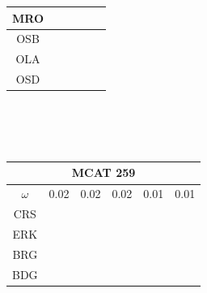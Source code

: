 \documentclass[12pt]{article}
\begin{document}
\begin{landscape}
\begin{figure}
{\begin{minipage}[c]{0.3\textwidth}
\begin{tabular}{|c|c|c|c|c|c|}
        MRO&\cellcolor[HTML]{4DAF4A}&\cellcolor[HTML]{4DAF4A}&\cellcolor[HTML]{4DAF4A}&\cellcolor[HTML]{984EA3}&\cellcolor[HTML]{984EA3}\\ \hline %
        OSB&\cellcolor[HTML]{4DAF4A}&\cellcolor[HTML]{4DAF4A}&\cellcolor[HTML]{4DAF4A}&\cellcolor[HTML]{984EA3}&\cellcolor[HTML]{984EA3}\\ \hline %
        OLA&\cellcolor[HTML]{984EA3}&\cellcolor[HTML]{984EA3}&\cellcolor[HTML]{984EA3}&\cellcolor[HTML]{FF7F00}&\cellcolor[HTML]{FF7F00}\\ \hline %
        OSD&\cellcolor[HTML]{FF7F00}&\cellcolor[HTML]{984EA3}&\cellcolor[HTML]{984EA3}&\cellcolor[HTML]{FF7F00}&\cellcolor[HTML]{FF7F00}\\ \hline %
\end{tabular}\\$~$\\$~$\\
\hspace*{-5cm}
\begin{tabular}{|c|c|c|c|c|c|}%
         \hline \multicolumn{6}{|c|}{MCAT 259} \\ \hline
         $\omega$&0.02&0.02&0.02&0.01&0.01\\ \hline %
        CRS&\cellcolor[HTML]{E41A1C}&\cellcolor[HTML]{E41A1C}&\cellcolor[HTML]{E41A1C}&\cellcolor[HTML]{E41A1C}&\cellcolor[HTML]{E41A1C}\\ \hline %
        ERK&\cellcolor[HTML]{E41A1C}&\cellcolor[HTML]{E41A1C}&\cellcolor[HTML]{377EB8}&\cellcolor[HTML]{377EB8}&\cellcolor[HTML]{377EB8}\\ \hline %
        BRG&\cellcolor[HTML]{377EB8}&\cellcolor[HTML]{377EB8}&\cellcolor[HTML]{4DAF4A}&\cellcolor[HTML]{377EB8}&\cellcolor[HTML]{377EB8}\\ \hline %
        BDG&\cellcolor[HTML]{377EB8}&\cellcolor[HTML]{377EB8}&\cellcolor[HTML]{4DAF4A}&\cellcolor[HTML]{4DAF4A}&\cellcolor[HTML]{4DAF4A}\\ \hline %

\end{tabular}
\end{minipage}}
\end{figure}
\end{landscape}
\end{document}
